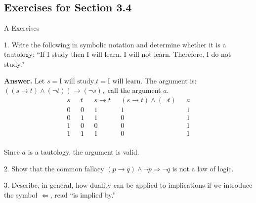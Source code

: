 \documentclass[10pt,]{book}
\theoremstyle{plain}
\theoremstyle{definition}
\theoremstyle{definition}
\theoremstyle{definition}
\theoremstyle{definition}
\begin{document}
\typeout{************************************************}
\typeout{************************************************}
\subsection[Exercises for Section 3.4 ]{Exercises for Section 3.4 }\label{exercises-3.4}
\hypertarget{exercisegroup-5}{}\typeout{************************************************}
\typeout{************************************************}
A Exercises%
\begin{exercisegroup}
\item[1.]\hypertarget{exercise-20}{}Write the following in symbolic notation and determine whether it is a tautology: ``If I study then I will learn. I will not learn. Therefore,
I do not study.''%
\par\smallskip
\par\smallskip
\noindent\textbf{Answer.}\hypertarget{answer-9}{}\quad
Let \(s=\textrm{I will study}\),\(t=\textrm{I will learn.}\)  The argument is: \(((s\to t)\land (\neg t))\to (\neg s) ,\) call the argument \(a\).
\begin{equation*}
\begin{array}{ccccc}
 s\text{   } & t\text{  } & s\to t\text{   } & (s\to t)\land (\neg t)\text{   } & a \\
\hline
 0\text{   } & 0\text{   } & 1\text{   } & 1\text{   } & 1 \\
 0\text{   } & 1\text{   } & 1\text{   } & 0\text{   } & 1 \\
 1\text{   } & 0\text{   } & 0\text{   } & 0\text{   } & 1 \\
 1\text{   } & 1\text{   } & 1\text{   } & 0\text{   } & 1 \\
\end{array}
\end{equation*}%
\par
Since \(a\) is a tautology, the argument is valid.%
\item[2.]\hypertarget{exercise-21}{}Show that the common fallacy \((p\to  q) \land  \neg p \Rightarrow  \neg q\) is not a law of logic.%
\par\smallskip
\item[3.]\hypertarget{exercise-22}{}Describe, in general, how duality can be applied to implications if we introduce the symbol \(\Leftarrow\), read ``is implied by.''%
\par\smallskip
\par\smallskip

\end{exercisegroup}
\end{document}
